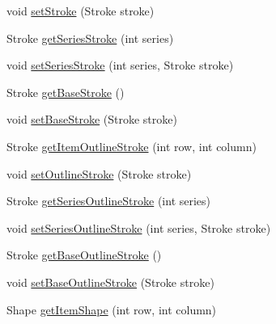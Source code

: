 \begin{DoxyCompactItemize}
\item 
void \mbox{\hyperlink{interfaceorg_1_1jfree_1_1chart_1_1renderer_1_1category_1_1_category_item_renderer_a5c1687a1dd15aa18ea1dd2b27c84888e}{set\+Stroke}} (Stroke stroke)
\item 
Stroke \mbox{\hyperlink{interfaceorg_1_1jfree_1_1chart_1_1renderer_1_1category_1_1_category_item_renderer_a4a3ff6564fafaf686b0cf73b564fabff}{get\+Series\+Stroke}} (int series)
\item 
void \mbox{\hyperlink{interfaceorg_1_1jfree_1_1chart_1_1renderer_1_1category_1_1_category_item_renderer_a8caf7dacd7b0db2b0d2c524b5cd9f84a}{set\+Series\+Stroke}} (int series, Stroke stroke)
\item 
Stroke \mbox{\hyperlink{interfaceorg_1_1jfree_1_1chart_1_1renderer_1_1category_1_1_category_item_renderer_a0a7eacce926274d0557216f6f570435c}{get\+Base\+Stroke}} ()
\item 
void \mbox{\hyperlink{interfaceorg_1_1jfree_1_1chart_1_1renderer_1_1category_1_1_category_item_renderer_a4257e7b0cbcca4dcb130a2f0e239c0cd}{set\+Base\+Stroke}} (Stroke stroke)
\item 
Stroke \mbox{\hyperlink{interfaceorg_1_1jfree_1_1chart_1_1renderer_1_1category_1_1_category_item_renderer_ad7517f4cb86d699eeda551e819aa162d}{get\+Item\+Outline\+Stroke}} (int row, int column)
\item 
void \mbox{\hyperlink{interfaceorg_1_1jfree_1_1chart_1_1renderer_1_1category_1_1_category_item_renderer_a7cfc859cf23ca978b2266a2d34650148}{set\+Outline\+Stroke}} (Stroke stroke)
\item 
Stroke \mbox{\hyperlink{interfaceorg_1_1jfree_1_1chart_1_1renderer_1_1category_1_1_category_item_renderer_af92cab3b28cb791e01ecfab7d562f3cb}{get\+Series\+Outline\+Stroke}} (int series)
\item 
void \mbox{\hyperlink{interfaceorg_1_1jfree_1_1chart_1_1renderer_1_1category_1_1_category_item_renderer_a07b423a5d7e9af0bd6a5a68b3ac5cd3f}{set\+Series\+Outline\+Stroke}} (int series, Stroke stroke)
\item 
Stroke \mbox{\hyperlink{interfaceorg_1_1jfree_1_1chart_1_1renderer_1_1category_1_1_category_item_renderer_aa4e62e03eb5014805e4130ac51b5be78}{get\+Base\+Outline\+Stroke}} ()
\item 
void \mbox{\hyperlink{interfaceorg_1_1jfree_1_1chart_1_1renderer_1_1category_1_1_category_item_renderer_a3440b96cffb9e0312622dc733fb18f73}{set\+Base\+Outline\+Stroke}} (Stroke stroke)
\item 
Shape \mbox{\hyperlink{interfaceorg_1_1jfree_1_1chart_1_1renderer_1_1category_1_1_category_item_renderer_a2113db0107c730b0244785e6d7db75bd}{get\+Item\+Shape}} (int row, int column)

\end{DoxyCompactItemize}
